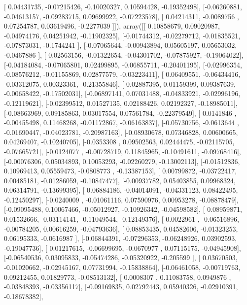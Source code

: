 \documentclass{article}
\begin{document}
       [ 0.04431735, -0.07215426, -0.10020327,  0.10594428, -0.19352498],
       [-0.06260881, -0.04613157, -0.09283715,  0.09699922, -0.07223578],
       [ 0.04214311, -0.0089756 ,  0.07254787,  0.03619496, -0.2277039 ]]), array([[ 0.10858679,  0.09020987, -0.04974176,  0.04251942, -0.11902325],
       [-0.01744312, -0.02279712, -0.01835521, -0.07873031, -0.1744241 ],
       [-0.07065644, -0.00943894,  0.05605197,  0.05653032, -0.0467886 ],
       [ 0.02563156, -0.01322654, -0.04301702, -0.07875927, -0.19064022],
       [-0.04184084, -0.07065801,  0.02499895, -0.06855711, -0.20401195],
       [-0.02996354, -0.08576212, -0.01155869,  0.02877579, -0.03223411],
       [ 0.06409551, -0.06434416, -0.03312075,  0.00323361, -0.21355846],
       [ 0.02887395,  0.01159399,  0.09387639, -0.00658422, -0.17502031],
       [-0.06897141,  0.07031488, -0.04833921, -0.02996196, -0.12119621],
       [-0.02399512,  0.01527135,  0.02188426,  0.02192327, -0.18985011],
       [-0.08663969,  0.09185863,  0.03017554,  0.07561784, -0.22379549],
       [ 0.0141846 , -0.00455498,  0.11468268, -0.01172867, -0.06163837],
       [-0.05730756, -0.0613644 , -0.01690447, -0.04023781, -0.20987163],
       [-0.08930678,  0.07346828,  0.00600665,  0.04269407, -0.10240705],
       [-0.0353308 ,  0.09502563,  0.02444475, -0.02115705, -0.07665721],
       [-0.0124077 , -0.00728719,  0.11845965, -0.10491611, -0.09768416],
       [-0.00076306,  0.05034893,  0.10053293, -0.02260279, -0.13002113],
       [-0.01512836,  0.10969413,  0.05559473, -0.0808773 , -0.13387153],
       [ 0.00799872, -0.03722417,  0.00485181, -0.01286059, -0.10847477],
       [-0.00937782,  0.05403855,  0.09968324,  0.06314791, -0.13699395],
       [ 0.06884186, -0.04014091, -0.04331123,  0.08422495, -0.12450297],
       [-0.0240009 , -0.01061116,  0.07590976,  0.00953278, -0.08878479],
       [-0.09095488,  0.10067466, -0.05012927, -0.10926342, -0.04598582],
       [ 0.08959871,  0.01532666, -0.03114141, -0.11049544, -0.12149376],
       [ 0.0022961 , -0.06516896, -0.00784205,  0.00616259, -0.04793636],
       [ 0.08853435,  0.04582606, -0.01323253,  0.06195333, -0.0616987 ],
       [-0.06844391, -0.07296353, -0.06248926,  0.03902593, -0.19047736],
       [ 0.01217615, -0.06699695, -0.0670977 ,  0.07115175, -0.04945908],
       [-0.06540536,  0.03095833, -0.05474286, -0.05320922, -0.205599  ],
       [ 0.03670503, -0.01020662, -0.02945167,  0.07731994, -0.15838864],
       [-0.06461058, -0.00719763,  0.09212455,  0.01829773, -0.08513132],
       [ 0.0008307 ,  0.11083758,  0.0949876 , -0.03848393, -0.03356117],
       [-0.09169835,  0.02792443,  0.05940326, -0.02910391, -0.18678382],
\end{document}
